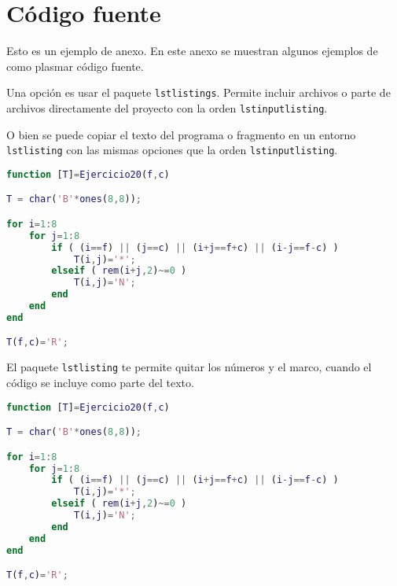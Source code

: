\section{Código fuente} 
\label{sec:codigo-fuente}

Esto es un ejemplo de anexo. En este anexo se muestran algunos ejemplos de como plasmar código fuente.

Una opción es usar el paquete \texttt{lstlistings}.  Permite incluir archivos o parte de archivos directamente del proyecto con la orden \texttt{lstinputlisting}.



O bien se puede copiar el texto del programa o fragmento en un entorno \texttt{lstlisting} con las mismas opciones que la orden \texttt{lstinputlisting}.

\begin{lstlisting}[language=Matlab,
    caption={Ejercicio 20 como texto en línea.},
    label=src:ej20-online
]
function [T]=Ejercicio20(f,c)

T = char('B'*ones(8,8));

for i=1:8
    for j=1:8
        if ( (i==f) || (j==c) || (i+j==f+c) || (i-j==f-c) )
            T(i,j)='*';
        elseif ( rem(i+j,2)~=0 )
            T(i,j)='N';
        end
    end
end

T(f,c)='R';
\end{lstlisting}


\noindent El paquete \texttt{lstlisting} te permite quitar los números y el marco, cuando el código se incluye como parte del texto. 

\begin{lstlisting}[language=Matlab,
    frame=none,numbers=none
]
function [T]=Ejercicio20(f,c)

T = char('B'*ones(8,8));

for i=1:8
    for j=1:8
        if ( (i==f) || (j==c) || (i+j==f+c) || (i-j==f-c) )
            T(i,j)='*';
        elseif ( rem(i+j,2)~=0 )
            T(i,j)='N';
        end
    end
end

T(f,c)='R';
\end{lstlisting}


